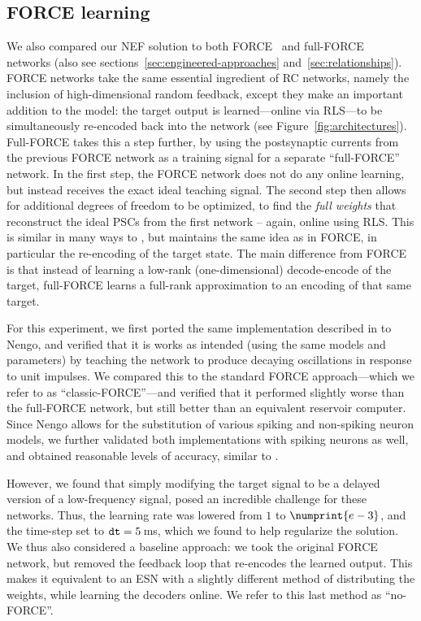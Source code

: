 \subsection{FORCE learning}
\label{sec:force-comparison}

We also compared our NEF solution to both FORCE~\citep{sussillo2009generating} and full-FORCE~\citep{depasquale2018full} networks (also see sections~\ref{sec:engineered-approaches} and~\ref{sec:relationships}).
FORCE networks take the same essential ingredient of RC networks, namely the inclusion of high-dimensional random feedback, except they make an important addition to the model: the target output is learned---online via RLS---to be simultaneously re-encoded back into the network (see Figure~\ref{fig:architectures}).
Full-FORCE takes this a step further, by using the postsynaptic currents from the previous FORCE network as a training signal for a separate ``full-FORCE'' network. 
In the first step, the FORCE network does not do any online learning, but instead receives the exact ideal teaching signal.
The second step then allows for additional degrees of freedom to be optimized, to find the \emph{full weights} that reconstruct the ideal PSCs from the first network -- again, online using RLS.
This is similar in many ways to \citet{tripp2006neural}, but maintains the same idea as in FORCE, in particular the re-encoding of the target state.
The main difference from FORCE is that instead of learning a low-rank (one-dimensional) decode-encode of the target, full-FORCE learns a full-rank approximation to an encoding of that same target.

For this experiment, we first ported the same implementation described in \citet{depasquale2018full} to Nengo, and verified that it is works as intended (using the same models and parameters) by teaching the network to produce decaying oscillations in response to unit impulses.
We compared this to the standard FORCE approach---which we refer to as ``classic-FORCE''---and verified that it performed slightly worse than the full-FORCE network, but still better than an equivalent reservoir computer.
Since Nengo allows for the substitution of various spiking and non-spiking neuron models, we further validated both implementations with spiking neurons as well, and obtained reasonable levels of accuracy, similar to \citet{depasquale2016using, thalmeier2016learning, nicola2016supervised}.

However, we found that simply modifying the target signal to be a delayed version of a low-frequency signal, posed an incredible challenge for these networks.
Thus, the learning rate was lowered from $1$ to $\numprint{e-3}$, and the time-step set to $\texttt{dt}{} = 5$\,ms, which we found to help regularize the solution.
We thus also considered a baseline approach:
we took the original FORCE network, but removed the feedback loop that re-encodes the learned output.
This makes it equivalent to an ESN with a slightly different method of distributing the weights, while learning the decoders online.
We refer to this last method as ``no-FORCE''.

